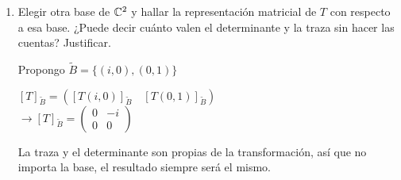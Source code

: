 \begin{enumerate}
\begin{mdframed}[style=s]
            \end{mdframed}
        \item Elegir otra base de $\mathbb{C}^2$ y hallar la representación matricial de $T$ con respecto a esa base. ¿Puede decir cuánto valen el determinante y la traza sin hacer las cuentas? Justificar.
            \begin{mdframed}[style=s]
                Propongo $\tilde{B}=\{(i,0),(0,1)\}$
                \begin{center}
                    $[T]_{\tilde{B}}=\left([T(i,0)]_{\tilde{B}}\quad[T(0,1)]_{\tilde{B}}\right)$\\
                    $\to [T]_{\tilde{B}}=\begin{pmatrix}
                        0&-i\\0&0
                    \end{pmatrix}$
                \end{center}
                La traza y el determinante son propias de la transformación, así que no importa la base, el resultado siempre será el mismo.
            \end{mdframed}
    \end{enumerate}